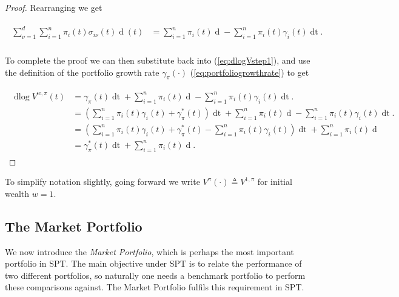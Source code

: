 \documentclass[british]{amsart} \usepackage{lmodern}
\numberwithin{equation}{section} \numberwithin{figure}{section}
\theoremstyle{plain} \newtheorem{thm}{\protect\theoremname}[section]
\theoremstyle{definition} \newtheorem{defn}[thm]{\protect\definitionname}
\theoremstyle{plain} \newtheorem{assumption}[thm]{\protect\assumptionname}
\theoremstyle{plain} \newtheorem{lem}[thm]{\protect\lemmaname}
\theoremstyle{plain} \newtheorem{prop}[thm]{\protect\propositionname}
\theoremstyle{remark} \newtheorem{rem}[thm]{\protect\remarkname}
\theoremstyle{plain} \newtheorem{cor}[thm]{\protect\corollaryname}
\renewcommand{\d}[1]{\mathop{\mathrm{d}{#1}}}
\newcommand{\defeq}{\mathop{\triangleq}} \newcommand{\almostsurely}{\text{a.s.}}
\newcommand{\V}{V^{w,\pi}}
\begin{document}
\begin{proof}
  Rearranging we get 

  \begin{gather*}
    \begin{split}
       \sum_{\nu=1}^{d} \sum_{i=1}^{n} 
            \pi_{i}(t) \sigma_{i\nu}(t) \d{W_{\nu}}(t) &=
       \sum_{i=1}^{n} \pi_{i}(t) \d{\log{X_{i}(t)}} -
       \sum_{i=1}^{n} \pi_{i}(t) \gamma_{i}(t) \d{t}. \\
    \end{split}
  \end{gather*}

  To complete the proof we can then substitute back into (\ref{eq:dlogVstep1}),
  and use the  definition of the portfolio growth rate $\gamma_{\pi}(\cdot)$
  (\ref{eq:portfoliogrowthrate}) to get 

  \begin{gather}
    \begin{split}
      \d\log{\V(t)} 
      &=
        \gamma_{\pi}(t) \d{t} +
        \sum_{i=1}^{n} \pi_{i}(t) \d{\log{X_{i}(t)}} -
        \sum_{i=1}^{n} \pi_{i}(t) \gamma_{i}(t) \d{t}. \\
      &=
        \left( 
            \sum_{i=1}^{n} \pi_{i}(t)\gamma_{i}(t) + \gamma_{\pi}^{*}(t) 
        \right) \d{t} +
        \sum_{i=1}^{n} \pi_{i}(t) \d{\log{X_{i}(t)}} -
        \sum_{i=1}^{n} \pi_{i}(t) \gamma_{i}(t) \d{t}. \\
       &=
        \left( 
            \sum_{i=1}^{n} \pi_{i}(t)\gamma_{i}(t) 
            + \gamma_{\pi}^{*}(t) 
            - \sum_{i=1}^{n} \pi_{i}(t) \gamma_{i}(t)
        \right) \d{t} +
        \sum_{i=1}^{n} \pi_{i}(t) \d{\log{X_{i}(t)}} \\
       &=
        \gamma_{\pi}^{*}(t)\d{t} +
        \sum_{i=1}^{n} \pi_{i}(t) \d{\log{X_{i}(t)}}.
    \end{split}
  \end{gather}

\end{proof}

To simplify notation slightly, going forward we write $V^{\pi}(\cdot) \defeq V^{1,\pi}$ for initial wealth $w=1$.

\newpage


\subsection{The Market Portfolio}

We now introduce the \textit{Market Portfolio}, which is perhaps the most
important portfolio in SPT. The main objective under SPT is to relate the 
performance of two different portfolios, so naturally one needs a 
benchmark portfolio to perform these comparisons against. The Market Portfolio
fulfils this requirement in SPT.
\end{document}

